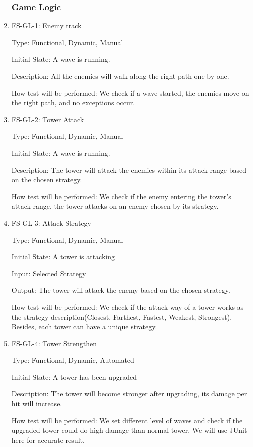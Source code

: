 \documentclass[12pt]{article}
\begin{document}
\begin{enumerate}
	\subsubsection{Game Logic}				
	
	\item{FS-GL-1: Enemy track}

	Type: Functional, Dynamic, Manual

	Initial State: A wave is running.
	
    Description: All the enemies will walk along the right path one by one.
	
	How test will be performed: We check if a wave started, the enemies move on the right path, and no exceptions occur.
	
	\item{FS-GL-2: Tower Attack}
					
	Type: Functional, Dynamic, Manual
					
    Initial State: A wave is running.
					
	Description: The tower will attack the enemies within its attack range based on the chosen strategy.
					
	How test will be performed: We check if the enemy entering the tower's attack range, the tower attacks on an enemy chosen by its strategy.
					
	\item{FS-GL-3: Attack Strategy}
					
    Type: Functional, Dynamic, Manual
					
	Initial State: A tower is attacking
					
	Input: Selected Strategy
					
	Output: The tower will attack the enemy based on the chosen strategy.
					
	How test will be performed: We check if the attack way of a tower works as the strategy description(Closest, Farthest, Fastest, Weakest, Strongest). Besides, each tower can have a unique strategy.
	
	\item{FS-GL-4: Tower Strengthen}
	
	Type: Functional, Dynamic, Automated
	
	Initial State: A tower has been upgraded
	
	Description: The tower will become stronger after upgrading, its damage per hit will increase.
	
	How test will be performed: We set different level of waves and check if the upgraded tower could do high damage than normal tower. We will use JUnit here for accurate result.
	

\end{enumerate}
\end{document}
